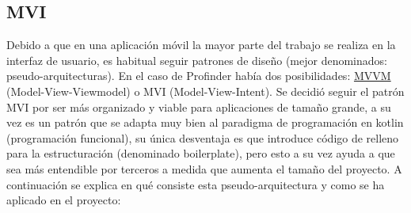 \subsection{MVI}
\label{subsec:mvi}
Debido a que en una aplicación móvil la mayor parte del trabajo se realiza en la interfaz de usuario, es habitual seguir patrones de diseño (mejor denominados: pseudo-arquitecturas). En el caso de Profinder había dos posibilidades: \href{https://builtin.com/software-engineering-perspectives/mvvm-architecture}{MVVM} (Model-View-Viewmodel) o MVI (Model-View-Intent). Se decidió seguir el patrón MVI por ser más organizado y viable para aplicaciones de tamaño grande, a su vez es un patrón que se adapta muy bien al paradigma de programación en kotlin (programación funcional), su única desventaja es que introduce código de relleno para la estructuración (denominado boilerplate), pero esto a su vez ayuda a que sea más entendible por terceros a medida que aumenta el tamaño del proyecto. A continuación se explica en qué consiste esta pseudo-arquitectura y como se ha aplicado en el proyecto:
